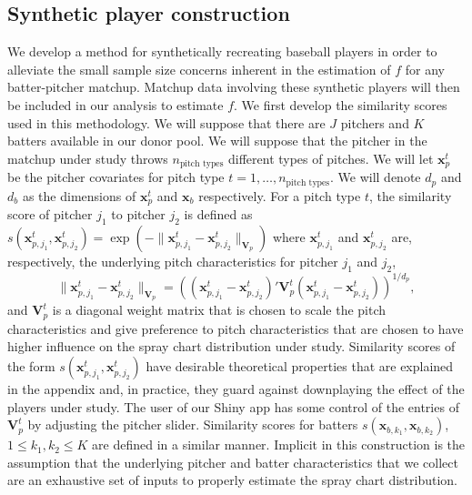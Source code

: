 \documentclass[12pt]{article}
\newcommand{\V}{\textbf{V}}
\newcommand{\x}{\textbf{x}}
\begin{document}
\subsection{Synthetic player construction}

We develop a method for synthetically recreating baseball players in order to alleviate the small sample size concerns inherent in the estimation of $f$ for any batter-pitcher matchup. Matchup data involving these synthetic players will then be included in our analysis to estimate $f$. We first develop the similarity scores used in this methodology. We will suppose that there are $J$ pitchers and $K$ batters available in our donor pool. We will suppose that the pitcher in the matchup under study throws $n_{\text{pitch types}}$ different types of pitches. We will let $\x_p^t$ be the pitcher covariates for pitch type $t = 1,\ldots,n_{\text{pitch types}}$. We will denote $d_p$ and $d_b$ as the dimensions of $\x_p^t$ and $\x_b$ respectively. For a pitch type $t$, the similarity score of pitcher $j_1$ to pitcher $j_2$ is defined as $s(\x_{p,j_1}^t, \x_{p,j_2}^t) = \exp(-\|\x_{p,j_1}^t-\x_{p,j_2}^t\|_{\V_p})$ where $\x_{p,j_1}^t$ and $\x_{p,j_2}^t$ are, respectively, the underlying pitch characteristics for pitcher $j_1$ and $j_2$,
$$
   \|\x_{p,j_1}^t-\x_{p,j_2}^t\|_{\V_p} 
     = \left((\x_{p,j_1}^t-\x_{p,j_2}^t)'\V_p^t(\x_{p,j_1}^t-\x_{p,j_2}^t)\right)^{1/d_p},
$$ 
and $\V_p^t$ is a diagonal weight matrix that is chosen to scale the pitch characteristics and give preference to pitch characteristics that are chosen to have higher influence on the spray chart distribution under study. Similarity scores of the form $s(\x_{p,j_1}^t, \x_{p,j_2}^t)$ have desirable theoretical properties that are explained in the appendix and, in practice, they guard against downplaying the effect of the players under study. The user of our Shiny app has some control of the entries of $\V_p^t$ by adjusting the pitcher slider. Similarity scores for batters $s(\x_{b,k_1}, \x_{b,k_2})$, $1 \leq k_1,k_2 \leq K$ are defined in a similar manner. Implicit in this construction is the assumption that the underlying pitcher and batter characteristics that we collect are an exhaustive set of inputs to properly estimate the spray chart distribution.
\end{document}
